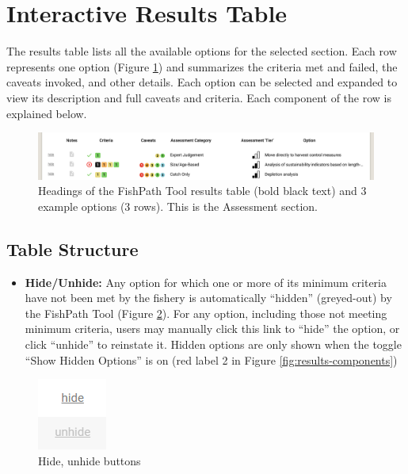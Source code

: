 \documentclass[
  11pt,
]{book}
\providecommand{\tightlist}{%
  \setlength{\itemsep}{0pt}\setlength{\parskip}{0pt}}
\begin{document}
\hypertarget{interactive-results-table}{%
\section{Interactive Results Table}\label{interactive-results-table}}

The results table lists all the available options for the selected section. Each row represents one option (Figure \ref{fig:result-rows}) and summarizes the criteria met and failed, the caveats invoked, and other details. Each option can be selected and expanded to view its description and full caveats and criteria. Each component of the row is explained below.

\begin{figure}

{\centering \includegraphics[width=0.95\linewidth]{images/results-rows} 

}

\caption{Headings of the FishPath Tool results table (bold black text) and 3 example options (3 rows). This is the Assessment section.}\label{fig:result-rows}
\end{figure}

\hypertarget{table-structure}{%
\subsection{Table Structure}\label{table-structure}}

\begin{itemize}
\tightlist
\item
  \textbf{Hide/Unhide:} Any option for which one or more of its minimum criteria have not been met by the fishery is automatically ``hidden'' (greyed-out) by the FishPath Tool (Figure \ref{fig:hide}). For any option, including those not meeting minimum criteria, users may manually click this link to ``hide'' the option, or click ``unhide'' to reinstate it. Hidden options are only shown when the toggle ``Show Hidden Options'' is on (red label 2 in Figure \ref{fig:results-components})
\end{itemize}

\begin{figure}

{\centering \includegraphics[width=0.1\linewidth]{images/hide} 

}

\caption{Hide, unhide buttons}\label{fig:hide}
\end{figure}
\end{document}
